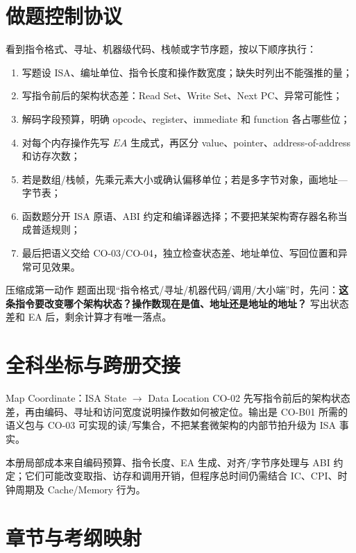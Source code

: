 \documentclass[UTF8,fontset=fandol,11pt,a4paper]{ctexart}
\newcommand{\kw}[1]{\textbf{\color{deep}#1}}
\begin{document}
\section{做题控制协议}

看到指令格式、寻址、机器级代码、栈帧或字节序题，按以下顺序执行：
\begin{enumerate}
  \item 写题设 ISA、编址单位、指令长度和操作数宽度；缺失时列出不能强推的量；
  \item 写指令前后的架构状态差：Read Set、Write Set、Next PC、异常可能性；
  \item 解码字段预算，明确 opcode、register、immediate 和 function 各占哪些位；
  \item 对每个内存操作先写 $EA$ 生成式，再区分 value、pointer、address-of-address 和访存次数；
  \item 若是数组/栈帧，先乘元素大小或确认偏移单位；若是多字节对象，画地址—字节表；
  \item 函数题分开 ISA 原语、ABI 约定和编译器选择；不要把某架构寄存器名称当成普适规则；
  \item 最后把语义交给 CO-03/CO-04，独立检查状态差、地址单位、写回位置和异常可见效果。
\end{enumerate}

\begin{methodbox}{压缩成第一动作}
题面出现“指令格式/寻址/机器代码/调用/大小端”时，先问：\kw{这条指令要改变哪个架构状态？操作数现在是值、地址还是地址的地址？} 写出状态差和 EA 后，剩余计算才有唯一落点。
\end{methodbox}

\section{全科坐标与跨册交接}
\begin{corebox}{Map Coordinate：ISA State \texorpdfstring{$\to$}{->} Data Location}
CO-02 先写指令前后的架构状态差，再由编码、寻址和访问宽度说明操作数如何被定位。输出是 CO-B01 所需的语义包与 CO-03 可实现的读/写集合，不把某套微架构的内部节拍升级为 ISA 事实。
\end{corebox}
本册局部成本来自编码预算、指令长度、EA 生成、对齐/字节序处理与 ABI 约定；它们可能改变取指、访存和调用开销，但程序总时间仍需结合 IC、CPI、时钟周期及 Cache/Memory 行为。

\section{章节与考纲映射}
\end{document}
